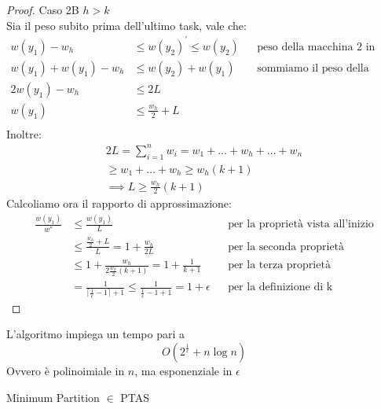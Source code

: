 \begin{proof}
    Caso 2B $h > k$\\
    Sia il peso subito prima dell'ultimo task, vale che: 
    \begin{equation}
        \begin{aligned}
            w(y_1) - w_h &\leq w(y_2)^\prime \leq w(y_2) && \text{peso della macchina 2 in quel momento}\\
            w(y_1) + w(y_1)- w_h &\leq w(y_2) + w(y_1)&& \text{sommiamo il peso della macchina 1}\\
            2w(y_1) - w_h &\leq 2L\\
            w(y_1) &\leq \frac{w_h}{2} + L\\
        \end{aligned}
    \end{equation}
    Inoltre:
    \begin{equation}
        \begin{aligned}
            2L = \sum_{i = 1}^{n} w_i = w_1 + \dots + w_h + \dots + w_n\\
            \geq w_1 + \dots + w_h \geq w_h(k+1)\\
            \implies L \geq \frac{w_h}{2}(k+1)
        \end{aligned}
    \end{equation}
    Calcoliamo ora il rapporto di approssimazione:
    \begin{equation}
        \begin{aligned}
            \frac{w(y_1)}{w^*} &\leq \frac{w(y_1)}{L}&& \text{per la proprietà vista all'inizio}\\
            &\leq \frac{\frac{w_h}{2} + L}{L} = 1 + \frac{w_h}{2L}&& \text{per la seconda proprietà}\\
            &\leq 1 + \frac{w_h}{2\frac{w_h}{2}(k+1)} = 1 + \frac{1}{k+1}&& \text{per la terza proprietà}\\
            &= \frac{1}{\lceil \frac{1}{\epsilon} -1 \rceil +1} \leq 
            \frac{1}{\frac{1}{\epsilon} -1 +1} = 1+\epsilon&& \text{per la definizione di k}
        \end{aligned}
    \end{equation}
\end{proof}
\begin{theorem}
    L'algoritmo impiega un tempo pari a 
    $$O(2^{\frac{1}{\epsilon}} + n\log n)$$
    Ovvero è polinoimiale in $n$, ma esponenziale in $\epsilon$
\end{theorem}
\begin{corollary}
    Minimum Partition $\in$ PTAS
\end{corollary}
